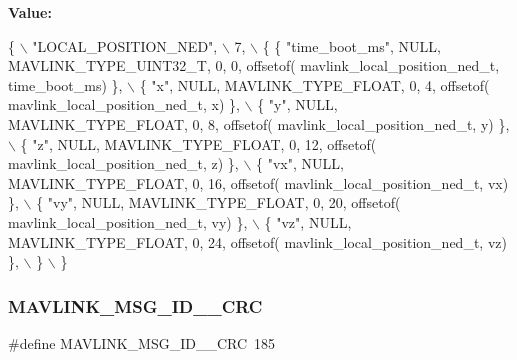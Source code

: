 {\bfseries Value\+:}
\begin{DoxyCode}
\{ \(\backslash\)
    \textcolor{stringliteral}{"LOCAL\_POSITION\_NED"}, \(\backslash\)
    7, \(\backslash\)
    \{  \{ \textcolor{stringliteral}{"time\_boot\_ms"}, NULL, MAVLINK_TYPE_UINT32_T, 0, 0, offsetof(
      mavlink_local_position_ned_t, time\_boot\_ms) \}, \(\backslash\)
         \{ \textcolor{stringliteral}{"x"}, NULL, MAVLINK_TYPE_FLOAT, 0, 4, offsetof(
      mavlink_local_position_ned_t, x) \}, \(\backslash\)
         \{ \textcolor{stringliteral}{"y"}, NULL, MAVLINK_TYPE_FLOAT, 0, 8, offsetof(
      mavlink_local_position_ned_t, y) \}, \(\backslash\)
         \{ \textcolor{stringliteral}{"z"}, NULL, MAVLINK_TYPE_FLOAT, 0, 12, offsetof(
      mavlink_local_position_ned_t, z) \}, \(\backslash\)
         \{ \textcolor{stringliteral}{"vx"}, NULL, MAVLINK_TYPE_FLOAT, 0, 16, offsetof(
      mavlink_local_position_ned_t, vx) \}, \(\backslash\)
         \{ \textcolor{stringliteral}{"vy"}, NULL, MAVLINK_TYPE_FLOAT, 0, 20, offsetof(
      mavlink_local_position_ned_t, vy) \}, \(\backslash\)
         \{ \textcolor{stringliteral}{"vz"}, NULL, MAVLINK_TYPE_FLOAT, 0, 24, offsetof(
      mavlink_local_position_ned_t, vz) \}, \(\backslash\)
         \} \(\backslash\)
\}
\end{DoxyCode}
\mbox{\label{mavlink__msg__local__position__ned_8h_a6356a3031912aa8266616ace2bfcd1d3}} 
\subsubsection{M\+A\+V\+L\+I\+N\+K\+\_\+\+M\+S\+G\+\_\+\+I\+D\+\_\+\_\+\+C\+RC}
{\footnotesize\ttfamily \#define M\+A\+V\+L\+I\+N\+K\+\_\+\+M\+S\+G\+\_\+\+I\+D\+\_\+\_\+\+C\+RC~185}

\mbox{\label{mavlink__msg__local__position__ned_8h_a4353f347b1cd0d893dfcfe119209ce0a}} 
